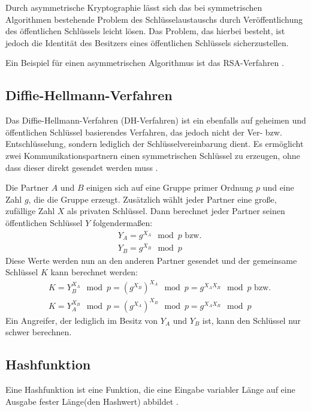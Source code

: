 Durch asymmetrische Kryptographie lässt sich das bei symmetrischen Algorithmen bestehende Problem des Schlüsselaustauschs durch Veröffentlichung des öffentlichen Schlüssels leicht lösen. Das Problem, das hierbei besteht, ist jedoch die Identität des Besitzers eines öffentlichen Schlüssels sicherzustellen.

Ein Beispiel für einen asymmetrischen Algorithmus ist das RSA-Verfahren \cite{Schneier2006}.

\subsection{Diffie-Hellmann-Verfahren}

\label{sec_diffie_hellman}

Das Diffie-Hellmann-Verfahren (DH-Verfahren) ist ein ebenfalls auf geheimen und öffentlichen Schlüssel basierendes Verfahren, das jedoch nicht der Ver- bzw. Entschlüsselung, sondern lediglich der Schlüsselvereinbarung dient. Es ermöglicht zwei Kommunikationspartnern einen symmetrischen Schlüssel zu erzeugen, ohne dass dieser direkt gesendet werden muss \cite{dh76}. 

Die Partner \(A\) und \(B\) einigen sich auf eine Gruppe primer Ordnung \(p\) und eine Zahl \(g\), die die Gruppe erzeugt. Zusätzlich wählt jeder Partner eine große, zufällige Zahl \(X\) als privaten Schlüssel. Dann berechnet jeder Partner seinen öffentlichen Schlüssel \(Y\) folgendermaßen:
\begin{align*}
&Y_A = g^{X_A} \mod{p} \text{ bzw.}\\
&Y_B = g^{X_B} \mod{p}
\end{align*}
Diese Werte werden nun an den anderen Partner gesendet und der gemeinsame Schlüssel \(K\) kann berechnet werden:
\begin{align*}
&K = Y_B^{X_A} \mod{p} = (g^{X_B})^{X_A }\mod{p} = g^{X_A X_B}\mod{p} \text{ bzw.}\\
&K = Y_A^{X_B} \mod{p} = (g^{X_A})^{X_B }\mod{p} = g^{X_A X_B}\mod{p} 
\end{align*}
Ein Angreifer, der lediglich im Besitz von \(Y_A\) und \(Y_B\) ist, kann den Schlüssel nur schwer berechnen. 

\subsection{Hashfunktion}

Eine Hashfunktion ist eine Funktion, die eine Eingabe variabler Länge auf eine Ausgabe fester Länge(den Hashwert) abbildet \cite{Schneier2006}.

